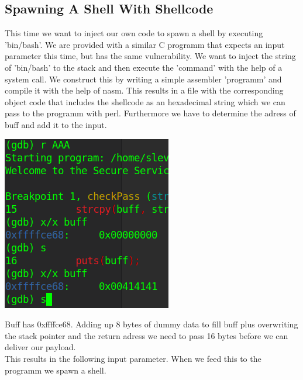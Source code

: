 \documentclass[a4paper,10pt]{article}
\begin{document}
\subsection{Spawning A Shell With Shellcode}
This time we want to inject our own code to spawn a shell by executing 'bin/bash'. We are provided with a similar C programm that expects an input parameter this time, but has the same vulnerability. We want to inject the string of 'bin/bash' to the stack and then execute the 'command' with the help of a system call.
We construct this by writing a simple assembler 'programm' and compile it with the help of nasm. This results in a file with the corresponding object code that includes the shellcode as an hexadecimal string which we can pass to the programm with perl. 
Furthermore we have to determine the adress of buff and add it to the input.
\begin{center}
 \includegraphics[scale=0.5]{breakpoint.png}
\end{center}
Buff has 0xffffce68. Adding up 8 bytes of dummy data to fill buff plus overwriting the stack pointer and the return adress we need to pass 16 bytes before we can deliver our payload.\\
This results in the following input parameter.
When we feed this to the programm we spawn a shell.


\newpage
\subsection{}
\end{document}
